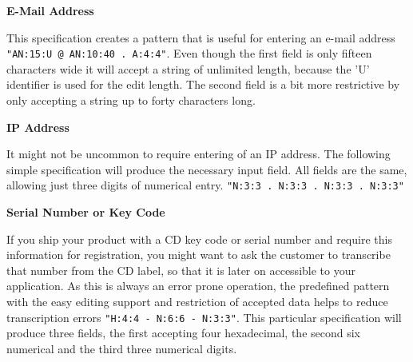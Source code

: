 \textbf{E-Mail Address}

This specification creates a pattern that is useful for entering an
e-mail address \texttt{"AN:15:U @ AN:10:40 . A:4:4"}. Even though the
first field is only fifteen characters wide it will accept a string of
unlimited length, because the 'U' identifier is used for the edit
length. The second field is a bit more restrictive by only accepting a
string up to forty characters long.\\

\begin{center}
\end{center}

\textbf{IP Address}

It might not be uncommon to require entering of an IP address. The
following simple specification will produce the necessary input field.
All fields are the same, allowing just three digits of numerical entry.
\texttt{"N:3:3 . N:3:3 . N:3:3 . N:3:3"}\\

\begin{center}
\end{center}

\textbf{Serial Number or Key Code}

If you ship your product with a CD key code or serial number and require
this information for registration, you might want to ask the customer to
transcribe that number from the CD label, so that it is later on
accessible to your application. As this is always an error prone
operation, the predefined pattern with the easy editing support and
restriction of accepted data helps to reduce transcription errors
\texttt{"H:4:4 - N:6:6 - N:3:3"}. This particular specification will
produce three fields, the first accepting four hexadecimal, the second
six numerical and the third three numerical digits.\\

